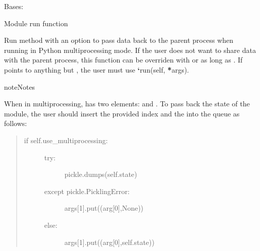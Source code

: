 \documentclass[letterpaper,10pt,openany,oneside,english]{sphinxmanual}
\begin{document}
\begin{fulllineitems}
\label{\detokenize{examples_rst/dummy_module:dummy_module.DummyModule}}
Bases: 

\begin{fulllineitems}
\label{\detokenize{examples_rst/dummy_module:dummy_module.DummyModule.run}}
Module run function

Run method with an option to pass data back to the parent process when running
in Python multiprocessing mode. If the user does not want to share data with
the parent process, this function can be overriden with 
or  as long as .
If  points to anything but , the user must use
{\color{red}\bfseries{}{}`}run(self, {\color{red}\bfseries{}*}args).

\begin{sphinxadmonition}{note}{Notes}

When in multiprocessing,  has two elements:  and .
To pass back the state of the module, the user should insert the provided
index  and the  into the queue as follows:
\begin{quote}
\begin{description}
\item[{if self.use\_multiprocessing:}] \leavevmode\begin{description}
\item[{try:}] \leavevmode
pickle.dumps(self.state)

\item[{except pickle.PicklingError:}] \leavevmode
args{[}1{]}.put((arg{[}0{]},None))

\item[{else:}] \leavevmode
args{[}1{]}.put((arg{[}0{]},self.state))

\end{description}

\end{description}
\end{quote}


\end{sphinxadmonition}
\end{fulllineitems}
\end{fulllineitems}
\end{document}
